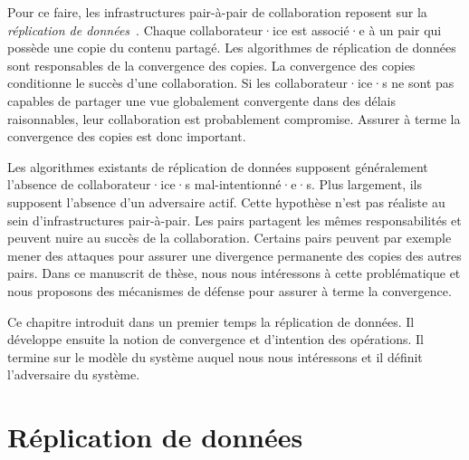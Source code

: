 Pour ce faire, les infrastructures pair-à-pair de collaboration reposent sur la \emph{réplication de données}~\autocite{saito_2005_optimisticreplication}.
Chaque collaborateur·ice est associé·e à un pair qui possède une copie du contenu partagé.
Les algorithmes de réplication de données sont responsables de la convergence des copies.
La convergence des copies conditionne le succès d'une collaboration.
Si les collaborateur·ice·s ne sont pas capables de partager une vue globalement convergente dans des délais raisonnables, leur collaboration est probablement compromise.
Assurer à terme la convergence des copies est donc important.

Les algorithmes existants de réplication de données supposent généralement l'absence de collaborateur·ice·s mal-intentionné·e·s.
Plus largement, ils supposent l'absence d'un adversaire actif.
Cette hypothèse n'est pas réaliste au sein d'infrastructures pair-à-pair.
Les pairs partagent les mêmes responsabilités et peuvent nuire au succès de la collaboration.
Certains pairs peuvent par exemple mener des attaques pour assurer une divergence permanente des copies des autres pairs.
Dans ce manuscrit de thèse, nous nous intéressons à cette problématique et nous proposons des mécanismes de défense pour assurer à terme la convergence.

Ce chapitre introduit dans un premier temps la réplication de données. Il développe ensuite la notion de convergence et d'intention des opérations.
Il termine sur le modèle du système auquel nous nous intéressons et il définit l'adversaire du système.

\section{Réplication de données}\label{sec:optimistic-replication}

